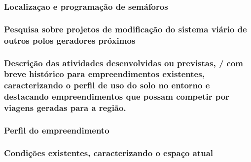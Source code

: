 \documentclass[]{article}
\begin{document}
\hypertarget{localizauxe7ao-e-programauxe7uxe3o-de-semuxe1foros}{%
\subsubsection{Localizaçao e programação de
semáforos}\label{localizauxe7ao-e-programauxe7uxe3o-de-semuxe1foros}}

\hypertarget{pesquisa-sobre-projetos-de-modificauxe7uxe3o-do-sistema-viuxe1rio-de-outros-polos-geradores-pruxf3ximos}{%
\subsubsection{Pesquisa sobre projetos de modificação do sistema viário
de outros polos geradores
próximos}\label{pesquisa-sobre-projetos-de-modificauxe7uxe3o-do-sistema-viuxe1rio-de-outros-polos-geradores-pruxf3ximos}}

\hypertarget{descriuxe7uxe3o-das-atividades-desenvolvidas-ou-previstas-com-breve-histuxf3rico-para-empreendimentos-existentes-caracterizando-o-perfil-de-uso-do-solo-no-entorno-e-destacando-empreendimentos-que-possam-competir-por-viagens-geradas-para-a-regiuxe3o.}{%
\subsubsection{Descrição das atividades desenvolvidas ou previstas, /
com breve histórico para empreendimentos existentes, caracterizando o
perfil de uso do solo no entorno e destacando empreendimentos que possam
competir por viagens geradas para a
região.}\label{descriuxe7uxe3o-das-atividades-desenvolvidas-ou-previstas-com-breve-histuxf3rico-para-empreendimentos-existentes-caracterizando-o-perfil-de-uso-do-solo-no-entorno-e-destacando-empreendimentos-que-possam-competir-por-viagens-geradas-para-a-regiuxe3o.}}

\hypertarget{perfil-do-empreendimento}{%
\subsubsection{Perfil do
empreendimento}\label{perfil-do-empreendimento}}

\hypertarget{condiuxe7uxf5es-existentes-caracterizando-o-espauxe7o-atual}{%
\subsubsection{Condições existentes, caracterizando o espaço
atual}\label{condiuxe7uxf5es-existentes-caracterizando-o-espauxe7o-atual}}
\end{document}
